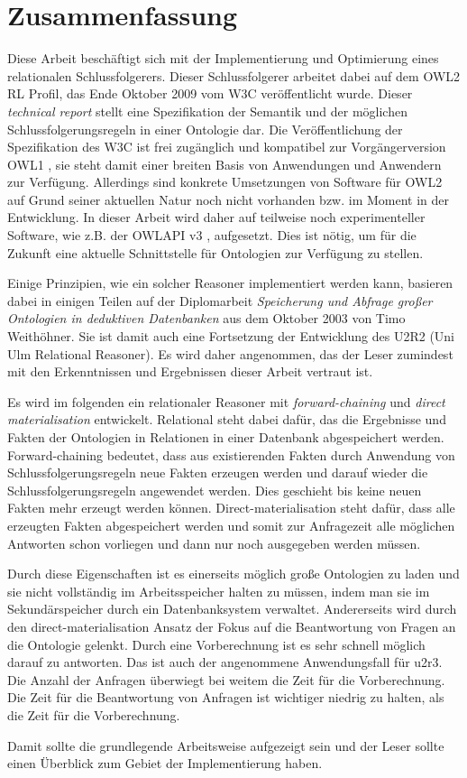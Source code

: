 \section*{Zusammenfassung}
Diese Arbeit beschäftigt sich mit der Implementierung und Optimierung eines relationalen Schlussfolgerers. Dieser Schlussfolgerer arbeitet dabei auf dem OWL2 RL Profil, das Ende Oktober 2009 vom W3C \cite{OWL2Profiles} veröffentlicht wurde. Dieser \emph{technical report} stellt eine Spezifikation der Semantik und der möglichen Schlussfolgerungsregeln in einer Ontologie dar. Die Veröffentlichung der Spezifikation des W3C ist frei zugänglich und kompatibel zur Vorgängerversion OWL1 \cite{OWL1}, sie steht damit einer breiten Basis von Anwendungen und Anwendern zur Verfügung. Allerdings sind konkrete Umsetzungen von Software für OWL2 auf Grund seiner aktuellen Natur noch nicht vorhanden bzw. im Moment in der Entwicklung. In dieser Arbeit wird daher auf teilweise noch experimenteller Software, wie z.B. der OWLAPI v3 \cite{OWLAPI}, aufgesetzt. Dies ist nötig, um für die Zukunft eine aktuelle Schnittstelle für Ontologien zur Verfügung zu stellen.

Einige Prinzipien, wie ein solcher Reasoner implementiert werden kann, basieren dabei in einigen Teilen auf der Diplomarbeit \emph{Speicherung und Abfrage großer Ontologien in deduktiven Datenbanken} aus dem Oktober 2003 von Timo Weithöhner. Sie ist damit auch eine Fortsetzung der Entwicklung des U2R2 (Uni Ulm Relational Reasoner). Es wird daher angenommen, das der Leser zumindest mit den Erkenntnissen und Ergebnissen dieser Arbeit vertraut ist.

Es wird im folgenden ein relationaler Reasoner mit \emph{forward-chaining} und \emph{direct materialisation} entwickelt. Relational steht dabei dafür, das die Ergebnisse und Fakten der Ontologien in Relationen in einer Datenbank abgespeichert werden. Forward-chaining bedeutet, dass aus existierenden Fakten durch Anwendung von Schlussfolgerungsregeln neue Fakten erzeugen werden und darauf wieder die Schlussfolgerungsregeln angewendet werden. Dies geschieht bis keine neuen Fakten mehr erzeugt werden können. Direct-materialisation steht dafür, dass alle erzeugten Fakten abgespeichert werden und somit zur Anfragezeit alle möglichen Antworten schon vorliegen und dann nur noch ausgegeben werden müssen.

Durch diese Eigenschaften ist es einerseits möglich große Ontologien zu laden und sie nicht vollständig im Arbeitsspeicher halten zu müssen, indem man sie im Sekundärspeicher durch ein Datenbanksystem verwaltet. Andererseits wird durch den direct-materialisation Ansatz der Fokus auf die Beantwortung von Fragen an die Ontologie gelenkt. Durch eine Vorberechnung ist es sehr schnell möglich darauf zu antworten. Das ist auch der angenommene Anwendungsfall für u2r3. Die Anzahl der Anfragen überwiegt bei weitem  die Zeit für die Vorberechnung. Die Zeit für die Beantwortung von Anfragen ist wichtiger niedrig zu halten, als die Zeit für die Vorberechnung.

Damit sollte die grundlegende Arbeitsweise aufgezeigt sein und der Leser sollte einen Überblick zum Gebiet der Implementierung haben.